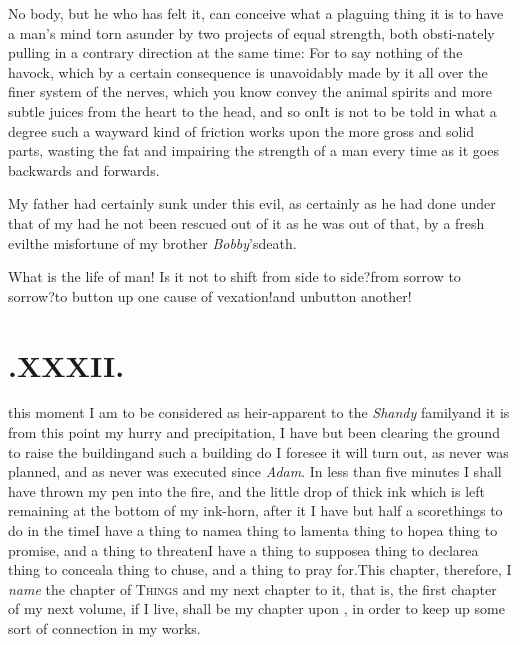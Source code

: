 \documentclass[twoside]{article}
\begin{document}
No body, but he who has felt it, can conceive what a plaguing
thing it is to have a man’s mind torn asunder by two projects
of equal strength, both obsti-\break nately pulling in a contrary direction
at the same time: For to say nothing of\break
the havock, which by a certain conse\-quence is unavoidably made by it all\break
over the finer system of the nerves,\break
which you know convey the animal\break
spirits and more subtle juices from the heart to the head, and so on\tsk It is\break
not to be told in what a degree such a wayward kind of friction works
upon the more gross and solid parts, wasting the fat and impairing
the strength of a man every time as it goes backwards and
forwards.

My father had certainly sunk under this evil, as certainly as he
had done under that of my \tsh\break had he not been rescued out of it as\break
he was out of that, by a fresh evil\tsh\break the misfortune of my
brother \textit{Bobby}’s\break death.

What is the life of man! Is it not to shift from side to
side?\tsk from sorrow to sorrow?\tsh to button up
one cause of vexation!\tsk and unbutton another!

\bigskip
\section{.\enspace XXXII.}

 this moment I am to be\break
considered as heir-apparent to the \textit{Shandy}
family\tsk and it is from this point
my hurry and precipitation, I have but
been clearing the ground to raise the\break
building\tsh and such a building do I\break
foresee it will turn out, as never was planned, and as never was executed since
\textit{Adam}. In less than five minutes I shall have thrown
my pen into the fire, and the little drop of thick ink which
is left remaining at the bottom of my ink-horn, after it\tsh
I have but half a score\break things to do in the time\tsh I have
a thing to name\tsh a thing to lament\tsh a thing to
hope\tsh a thing to promise, and a thing to threaten\tsk I
have a thing to suppose\tsk a thing to declare\tsh a thing
to conceal\tsh a thing to chuse, and a thing to pray
for.\tsh This chapter, therefore, I \textit{name} the chapter
of \textsc{Things}\tsh\break 
and my next chapter to it, that is, the\break
first chapter of my next volume, if I live,\break
shall be my chapter upon ,
in order to keep up some sort of connection in my works.
\end{document}
